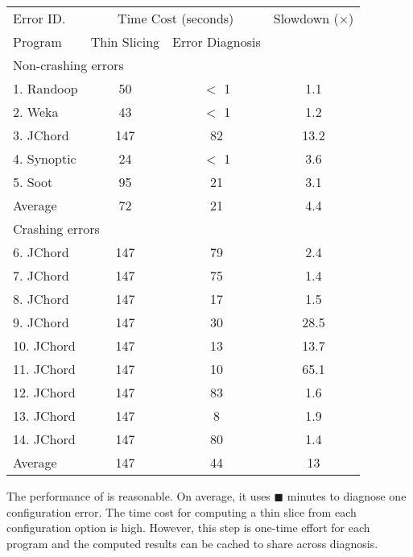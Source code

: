 \begin{table}[t]
\setlength{\tabcolsep}{.44\tabcolsep}
\begin{tabular}{|l|c|c|c|}
\hline
 Error ID. & \multicolumn{2}{|c|}{Time Cost (seconds)} & Slowdown ($\times$)\\
\cline{2-3}
 Program & Thin Slicing & Error Diagnosis &  \\
 \hline
\hline
\multicolumn{4}{|l|}{Non-crashing errors}   \\
 \hline
 1. Randoop & 50 & $<$ 1 & 1.1\\
 2. Weka & 43 & $<$ 1 & 1.2 \\
 3. JChord & 147 & 82 & 13.2\\
 4. Synoptic & 24 & $<$ 1 & 3.6 \\
 5. Soot & 95 & 21 & 3.1 \\
\hline
Average & 72 & 21 & 4.4\\
\hline
\hline
\multicolumn{4}{|l|}{Crashing errors}   \\
\hline
 6. JChord & 147 & 79 & 2.4\\
 7. JChord & 147 & 75 & 1.4\\
 8. JChord & 147 & 17 &1.5\\
 9. JChord & 147 & 30 & 28.5\\
 10. JChord & 147 & 13 &13.7\\
 11. JChord & 147 & 10 &65.1 \\
 12. JChord & 147 & 83 &1.6\\
 13. JChord & 147 & 8 &1.9\\
 14. JChord & 147 & 80 &1.4\\
\hline
Average & 147 & 44 & 13\\
\hline
\end{tabular}

\end{table}

The performance of \ourtool is reasonable.
On average, it uses $\blacksquare$ minutes to
diagnose one configuration error. The time cost for
computing a thin slice from each configuration option
is high. However, this step is one-time effort
for each program and the computed results can be cached
to share across diagnosis. %

